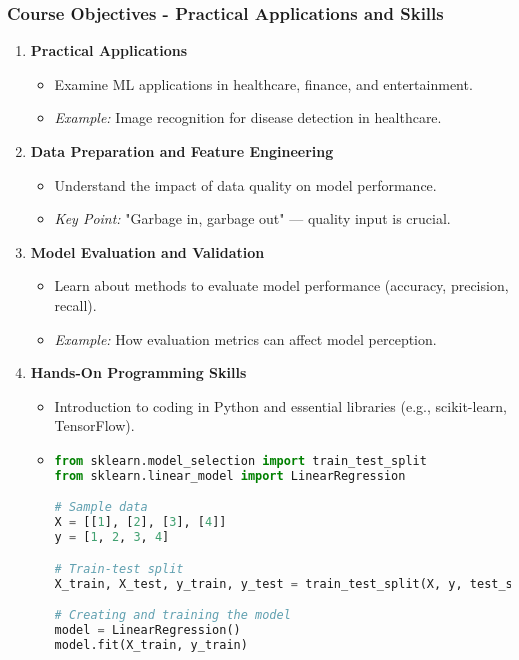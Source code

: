 \documentclass[aspectratio=169]{beamer}
\begin{document}
\begin{frame}[fragile]
    \frametitle{Course Objectives - Practical Applications and Skills}
    \begin{enumerate}[resume]
        \item \textbf{Practical Applications}
        \begin{itemize}
            \item Examine ML applications in healthcare, finance, and entertainment.
            \item \textit{Example:} Image recognition for disease detection in healthcare.
        \end{itemize}

        \item \textbf{Data Preparation and Feature Engineering}
        \begin{itemize}
            \item Understand the impact of data quality on model performance.
            \item \textit{Key Point:} "Garbage in, garbage out" — quality input is crucial.
        \end{itemize}

        \item \textbf{Model Evaluation and Validation}
        \begin{itemize}
            \item Learn about methods to evaluate model performance (accuracy, precision, recall).
            \item \textit{Example:} How evaluation metrics can affect model perception.
        \end{itemize}

        \item \textbf{Hands-On Programming Skills}
        \begin{itemize}
            \item Introduction to coding in Python and essential libraries (e.g., scikit-learn, TensorFlow).
            \item \begin{lstlisting}[language=Python]
from sklearn.model_selection import train_test_split
from sklearn.linear_model import LinearRegression

# Sample data
X = [[1], [2], [3], [4]]
y = [1, 2, 3, 4]

# Train-test split
X_train, X_test, y_train, y_test = train_test_split(X, y, test_size=0.2)

# Creating and training the model
model = LinearRegression()
model.fit(X_train, y_train)
            \end{lstlisting}
        \end{itemize}
    \end{enumerate}
\end{frame}
\end{document}
